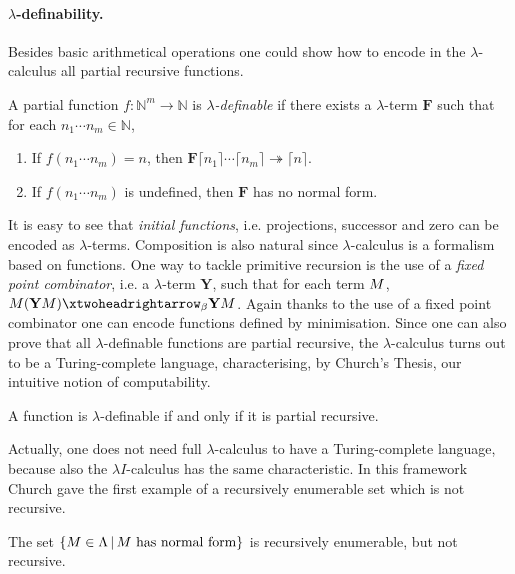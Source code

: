 \paragraph{$\lambda$-definability.}
Besides basic arithmetical operations one could show how to encode in the $\lambda$-calculus all partial recursive functions. 
\begin{definition}
	A partial function $f:\mathbb{N}^m\rightarrow\mathbb{N}$ is \emph{$\lambda$-definable} if there exists a $\lambda$-term $\mathbf{F}$ such that for each $n_1\cdots n_m\in\mathbb{N}$,
	\begin{enumerate}
		\item If $f(n_1\cdots n_m)=n$, then $\mathbf{F}\lceil n_1\rceil\cdots\lceil n_m\rceil\twoheadrightarrow \lceil n\rceil$.
		\item If $f(n_1\cdots n_m)$ is undefined, then $\mathbf{F}$  has no normal form.
	\end{enumerate}
\end{definition}
It is easy to see that \emph{initial functions}, i.e. projections, successor and zero can be encoded as $\lambda$-terms. Composition is also natural since $\lambda$-calculus is a formalism based on functions. One way to tackle primitive recursion is the use of a \emph{fixed point combinator}, i.e. a $\lambda$-term $\mathbf{Y}$, such that for each term $M$, $\termone(\mathbf{Y}\termone)\redbetared{}\mathbf{Y}\termone$. Again thanks to the use of a fixed point combinator one can encode functions defined by minimisation. 
Since one can also prove that all $\lambda$-definable functions are partial recursive, the $\lambda$-calculus turns out to be a Turing-complete language, characterising, by Church's Thesis, our intuitive notion of computability.
\begin{theorem}
	A function is $\lambda$-definable if and only if it is partial recursive.
\end{theorem}
Actually, one does not need full $\lambda$-calculus to have a Turing-complete language, because also the $\lambda I$-calculus has the same characteristic. In this framework Church gave the first example of a recursively enumerable set which is not recursive.
\begin{theorem}
	The set $\{M\in\Lambda\,|\,M\textrm{ has normal form}\}$ is recursively enumerable, but not recursive.
\end{theorem}

